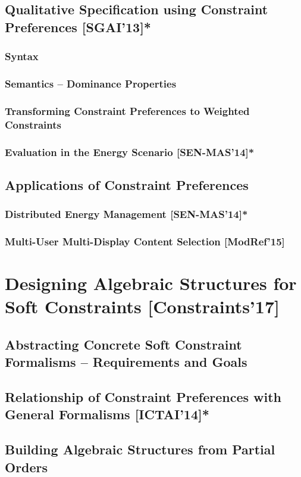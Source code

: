 \documentclass[10pt,a4paper]{book}
\begin{document}
\section{Qualitative Specification using Constraint Preferences [SGAI'13]*}
\subsection{Syntax}
\subsection{Semantics -- Dominance Properties}
\subsection{Transforming Constraint Preferences to Weighted Constraints}
\subsection{Evaluation in the Energy Scenario [SEN-MAS'14]*}
\section{Applications of Constraint Preferences}
\subsection{Distributed Energy Management [SEN-MAS'14]* }
\subsection{Multi-User Multi-Display Content Selection [ModRef'15]}

\chapter{Designing Algebraic Structures for Soft Constraints [Constraints'17]}
\section{Abstracting Concrete Soft Constraint Formalisms -- Requirements and Goals}
\section{Relationship of Constraint Preferences with General Formalisms [ICTAI'14]*}
\section{Building Algebraic Structures from Partial Orders}
\end{document}

